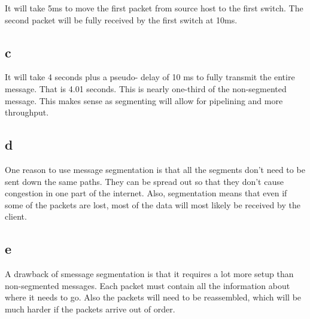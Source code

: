 \documentclass[12pt,letterpaper]{article}
\begin{document}
It will take 5ms to move the first packet from source host to the first switch.
The second packet will be fully received by the first switch at 10ms.
\subsection*{c}

It will take 4 seconds plus a pseudo- delay of 10 ms to fully transmit the entire message.
That is 4.01 seconds.
This is nearly one-third of the non-segmented message.
This makes sense as segmenting will allow for pipelining and more throughput.
\subsection*{d}

One reason to use message segmentation is that all the segments don't need to be sent down the same paths.
They can be spread out so that they don't cause congestion in one part of the internet.
Also, segmentation means that even if some of the packets are lost, most of the data will most likely be received by the client.

\subsection*{e}

A drawback of smessage segmentation is that it requires a lot more setup than non-segmented messages. 
Each packet must contain all the information about where it needs to go.
Also the packets will need to be reassembled, which will be much harder if the packets arrive out of order.
\end{document}
